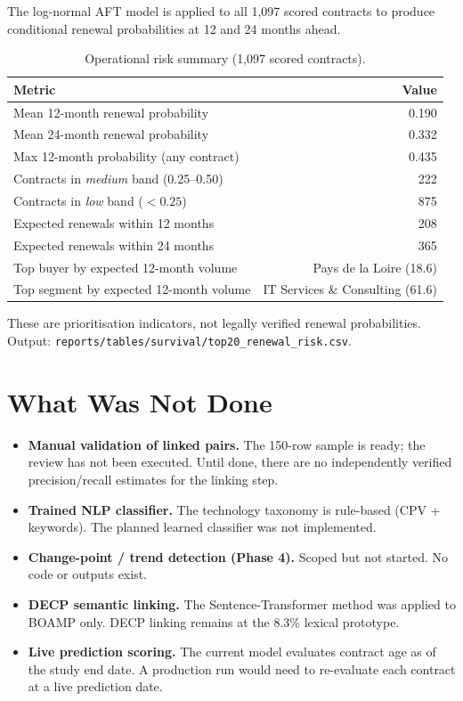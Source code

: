 \documentclass[11pt,a4paper]{article}
\begin{document}
The log-normal AFT model is applied to all 1,097 scored contracts to produce
conditional renewal probabilities at 12 and 24 months ahead.

\begin{table}[H]
\centering
\caption{Operational risk summary (1,097 scored contracts).}
\label{tab:risk}
\small
\begin{tabular}{@{}lr@{}}
\toprule
\textbf{Metric} & \textbf{Value} \\
\midrule
Mean 12-month renewal probability & 0.190 \\
Mean 24-month renewal probability & 0.332 \\
Max 12-month probability (any contract) & 0.435 \\
Contracts in \emph{medium} band (0.25--0.50) & 222 \\
Contracts in \emph{low} band ($<0.25$) & 875 \\
Expected renewals within 12 months & 208 \\
Expected renewals within 24 months & 365 \\
Top buyer by expected 12-month volume & Pays de la Loire (18.6) \\
Top segment by expected 12-month volume & IT Services \& Consulting (61.6) \\
\bottomrule
\end{tabular}
\end{table}

These are prioritisation indicators, not legally verified renewal probabilities.
Output: \nolinkurl{reports/tables/survival/top20_renewal_risk.csv}.

\section{What Was Not Done}
\label{sec:open}

\begin{itemize}[leftmargin=1.4em,itemsep=2pt]
  \item \textbf{Manual validation of linked pairs.} The 150-row sample is ready;
        the review has not been executed. Until done, there are no independently
        verified precision/recall estimates for the linking step.
  \item \textbf{Trained NLP classifier.} The technology taxonomy is rule-based
        (CPV + keywords). The planned learned classifier was not implemented.
  \item \textbf{Change-point / trend detection (Phase 4).} Scoped but not
        started. No code or outputs exist.
  \item \textbf{DECP semantic linking.} The Sentence-Transformer method was
        applied to BOAMP only. DECP linking remains at the 8.3\% lexical
        prototype.
  \item \textbf{Live prediction scoring.} The current model evaluates contract
        age as of the study end date. A production run would need to re-evaluate
        each contract at a live prediction date.
\end{itemize}
\end{document}
